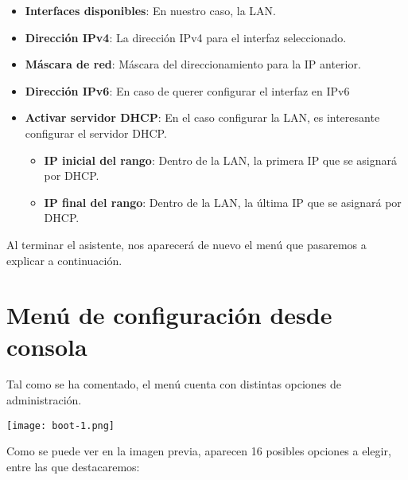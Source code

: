 \begin{itemize}
    \item \textbf{Interfaces disponibles}: En nuestro caso, la LAN.
    \item \textbf{Dirección IPv4}: La dirección IPv4 para el interfaz seleccionado.
    \item \textbf{Máscara de red}: Máscara del direccionamiento para la IP anterior.
    \item \textbf{Dirección IPv6}: En caso de querer configurar el interfaz en IPv6
    \item \textbf{Activar servidor DHCP}: En el caso configurar la LAN, es interesante configurar el servidor DHCP.
    \begin{itemize}
        \item \textbf{IP inicial del rango}: Dentro de la LAN, la primera IP que se asignará por DHCP.
        \item \textbf{IP final del rango}: Dentro de la LAN, la última IP que se asignará por DHCP.
    \end{itemize}
\end{itemize}


Al terminar el asistente, nos aparecerá de nuevo el menú que pasaremos a explicar a continuación.


\section{Menú de configuración desde consola}
Tal como se ha comentado, el menú cuenta con distintas opciones de administración.

\begin{center}
    \vspace{-10pt}
    \texttt{[image: boot-1.png]}
    \vspace{-10pt}
\end{center}

Como se puede ver en la imagen previa, aparecen 16 posibles opciones a elegir, entre las que destacaremos:

